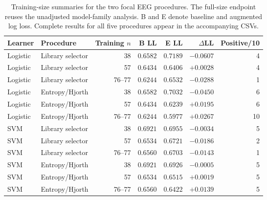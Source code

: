 \begin{table}[htbp]\centering
\caption{Training-size summaries for the two focal EEG procedures. The full-size endpoint reuses the unadjusted model-family analysis. B and E denote baseline and augmented log loss. Complete results for all five procedures appear in the accompanying CSVs.}\label{tab:learning-extension}
\begin{tabular}{llrrrrr}\toprule
Learner & Procedure & Training $n$ & B LL & E LL & $\Delta$LL & Positive/10\\\midrule
Logistic & Library selector & 38 & $0.6582$ & $0.7189$ & $-0.0607$ & 4\\
Logistic & Library selector & 57 & $0.6434$ & $0.6406$ & $+0.0028$ & 4\\
Logistic & Library selector & 76--77 & $0.6244$ & $0.6532$ & $-0.0288$ & 1\\
Logistic & Entropy/Hjorth & 38 & $0.6582$ & $0.7032$ & $-0.0450$ & 6\\
Logistic & Entropy/Hjorth & 57 & $0.6434$ & $0.6239$ & $+0.0195$ & 6\\
Logistic & Entropy/Hjorth & 76--77 & $0.6244$ & $0.5977$ & $+0.0267$ & 10\\
SVM & Library selector & 38 & $0.6921$ & $0.6955$ & $-0.0034$ & 5\\
SVM & Library selector & 57 & $0.6534$ & $0.6721$ & $-0.0186$ & 2\\
SVM & Library selector & 76--77 & $0.6560$ & $0.6703$ & $-0.0143$ & 1\\
SVM & Entropy/Hjorth & 38 & $0.6921$ & $0.6926$ & $-0.0005$ & 5\\
SVM & Entropy/Hjorth & 57 & $0.6534$ & $0.6515$ & $+0.0019$ & 5\\
SVM & Entropy/Hjorth & 76--77 & $0.6560$ & $0.6422$ & $+0.0139$ & 5\\
\bottomrule\end{tabular}\end{table}

